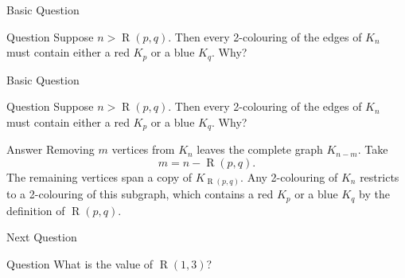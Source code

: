 \documentclass[aspectratio=169,11pt]{beamer}
\newcommand{\Ram}{\operatorname{R}}
\begin{document}
\begin{frame}[t]{Basic Question}
\vspace{0.10cm}

\begin{block}{Question}
\large
Suppose $n>\Ram(p,q)$. Then every 2-colouring of the edges of $K_n$
must contain either \textcolor{RamRed}{a red $K_p$} or
\textcolor{RamBlue}{a blue $K_q$}. Why?
\end{block}
\end{frame}

\begin{frame}[t]{Basic Question}
\vspace{0.10cm}

\begin{block}{Question}
\large
Suppose $n>\Ram(p,q)$. Then every 2-colouring of the edges of $K_n$
must contain either \textcolor{RamRed}{a red $K_p$} or
\textcolor{RamBlue}{a blue $K_q$}. Why?
\end{block}

\vspace{0.30cm}

\begin{alertblock}{Answer}
\large
Removing $m$ vertices from $K_n$ leaves the complete graph $K_{n-m}$.
Take
\[
  m=n-\Ram(p,q).
\]
The remaining vertices span a copy of $K_{\Ram(p,q)}$. Any 2-colouring
of $K_n$ restricts to a 2-colouring of this subgraph, which contains a
\textcolor{RamRed}{red $K_p$} or a \textcolor{RamBlue}{blue $K_q$} by
the definition of $\Ram(p,q)$.
\end{alertblock}
\end{frame}

\begin{frame}[t]{Next Question}
\vspace{0.10cm}

\begin{block}{Question}
\large
What is the value of $\Ram(1,3)$?
\end{block}
\end{frame}
\end{document}
